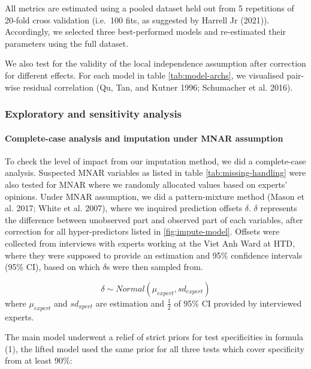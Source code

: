 \documentclass[
]{article}
\begin{document}
All metrics are estimated using a pooled dataset held out from 5 repetitions of 20-fold cross validation (i.e.~100 fits, as suggested by Harrell Jr (2021)). Accordingly, we selected three best-performed models and re-estimated their parameters using the full dataset.

We also test for the validity of the local independence assumption after correction for different effects. For each model in table \ref{tab:model-archs}, we visualised pair-wise residual correlation (Qu, Tan, and Kutner 1996; Schumacher et al. 2016).

\hypertarget{exploratory-and-sensitivity-analysis}{%
\subsubsection{Exploratory and sensitivity analysis}\label{exploratory-and-sensitivity-analysis}}

\hypertarget{complete-case-analysis-and-imputation-under-mnar-assumption}{%
\paragraph{Complete-case analysis and imputation under MNAR assumption}\label{complete-case-analysis-and-imputation-under-mnar-assumption}}

To check the level of impact from our imputation method, we did a complete-case analysis. Suspected MNAR variables as listed in table \ref{tab:missing-handling} were also tested for MNAR where we randomly allocated values based on experts' opinions. Under MNAR assumption, we did a pattern-mixture method (Mason et al. 2017; White et al. 2007), where we inquired prediction offsets \(\delta\). \(\delta\) represents the difference between unobserved part and observed part of each variables, after correction for all hyper-predictors listed in \ref{fig:impute-model}. Offsets were collected from interviews with experts working at the Viet Anh Ward at HTD, where they were supposed to provide an estimation and 95\% confidence intervals (95\% CI), based on which \(\delta\)s were then sampled from.

\[
\delta \sim Normal(\mu_{expert}, sd_{expert})
\]
where \(\mu_{expert}\) and \(sd_{xpert}\) are estimation and \(\frac{1}{2}\) of 95\% CI provided by interviewed experts.

The main model underwent a relief of strict priors for test specificities in formula (1), the lifted model used the same prior for all three tests which cover specificity from at least 90\%:
\end{document}
